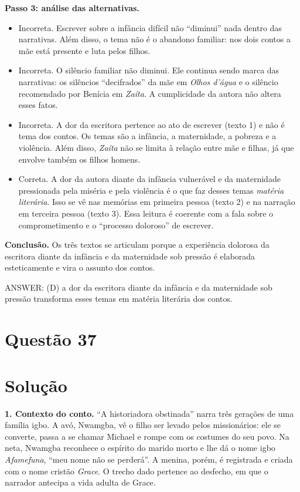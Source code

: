 \documentclass{article}%
\begin{document}
\textbf{Passo 3: análise das alternativas.}
\begin{itemize}
\item[(a)] Incorreta. Escrever sobre a infância difícil não ``diminui'' nada dentro das narrativas. Além disso, o tema não é o abandono familiar: nos dois contos a mãe está presente e luta pelos filhos.
\item[(b)] Incorreta. O silêncio familiar não diminui. Ele continua sendo marca das narrativas: os silêncios ``decifrados'' da mãe em \textit{Olhos d'água} e o silêncio recomendado por Benícia em \textit{Zaíta}. A cumplicidade da autora não altera esses fatos.
\item[(c)] Incorreta. A dor da escritora pertence ao ato de escrever (texto 1) e não é tema dos contos. Os temas são a infância, a maternidade, a pobreza e a violência. Além disso, \textit{Zaíta} não se limita à relação entre mãe e filhas, já que envolve também os filhos homens.
\item[(d)] Correta. A dor da autora diante da infância vulnerável e da maternidade pressionada pela miséria e pela violência é o que faz desses temas \emph{matéria literária}. Isso se vê nas memórias em primeira pessoa (texto 2) e na narração em terceira pessoa (texto 3). Essa leitura é coerente com a fala sobre o comprometimento e o ``processo doloroso'' de escrever.
\end{itemize}

\textbf{Conclusão.} Os três textos se articulam porque a experiência dolorosa da escritora diante da infância e da maternidade sob pressão é elaborada esteticamente e vira o assunto dos contos.

ANSWER: (D) a dor da escritora diante da infância e da maternidade sob pressão transforma esses temas em matéria literária dos contos.%
\newpage%
\section*{Questão 37}

\section*{Solução}

\textbf{1. Contexto do conto.} ``A historiadora obstinada'' narra três gerações de uma família igbo. A avó, Nwamgba, vê o filho ser levado pelos missionários: ele se converte, passa a se chamar Michael e rompe com os costumes do seu povo. Na neta, Nwamgba reconhece o espírito do marido morto e lhe dá o nome igbo \emph{Afamefuna}, ``meu nome não se perderá''. A menina, porém, é registrada e criada com o nome cristão \emph{Grace}. O trecho dado pertence ao desfecho, em que o narrador antecipa a vida adulta de Grace.
\end{document}
